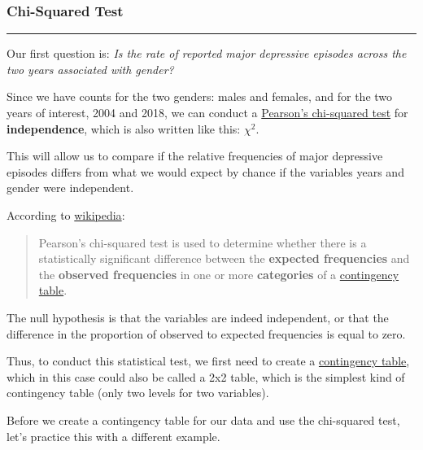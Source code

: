 \documentclass[
]{article}
\begin{document}
\hypertarget{chi-squared-test}{%
\subsubsection{\texorpdfstring{\textbf{Chi-Squared
Test}}{Chi-Squared Test}}\label{chi-squared-test}}

\begin{center}\rule{0.5\linewidth}{0.5pt}\end{center}

Our first question is: \emph{Is the rate of reported major depressive
episodes across the two years associated with gender?}

Since we have counts for the two genders: males and females, and for the
two years of interest, 2004 and 2018, we can conduct a
\href{https://en.wikipedia.org/wiki/Pearson\%27s_chi-squared_test\#:~:text=Pearson's\%20chi\%2Dsquared\%20test\%20is,differs\%20from\%20a\%20theoretical\%20distribution.}{Pearson's
chi-squared test} for \textbf{independence}, which is also written like
this: \({\chi}^2\).

This will allow us to compare if the relative frequencies of major
depressive episodes differs from what we would expect by chance if the
variables years and gender were independent.

According to
\href{https://en.wikipedia.org/wiki/Chi-squared_test?oldformat=true}{wikipedia}:

\begin{quote}
Pearson's chi-squared test is used to determine whether there is a
statistically significant difference between the \textbf{expected
frequencies} and the \textbf{observed frequencies} in one or more
\textbf{categories} of a
\href{https://en.wikipedia.org/wiki/Contingency_table}{contingency
table}.
\end{quote}

The null hypothesis is that the variables are indeed independent, or
that the difference in the proportion of observed to expected
frequencies is equal to zero.

Thus, to conduct this statistical test, we first need to create a
\href{https://en.wikipedia.org/wiki/Contingency_table}{contingency
table}, which in this case could also be called a 2x2 table, which is
the simplest kind of contingency table (only two levels for two
variables).

Before we create a contingency table for our data and use the
chi-squared test, let's practice this with a different example.
\end{document}
